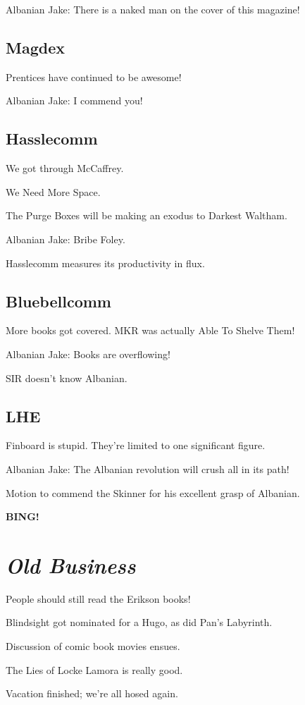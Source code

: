 \documentclass[10pt]{article}
\newcommand{\bing}{{\bf BING!} }
\newcommand{\goto}[1]{\bing \vskip 12pt \section*{{\em{#1}}}}
\begin{document}
Albanian Jake:  There is a naked man on the cover of this magazine!

\subsection*{Magdex}

Prentices have continued to be awesome!

Albanian Jake: I commend you!

\subsection*{Hasslecomm}

We got through McCaffrey.

We Need More Space.

The Purge Boxes will be making an exodus to Darkest Waltham.

Albanian Jake:  Bribe Foley.

Hasslecomm measures its productivity in flux.

\subsection*{Bluebellcomm}

More books got covered.  MKR was actually Able To Shelve Them!

Albanian Jake:  Books are overflowing!

SIR doesn't know Albanian.

\subsection*{LHE}

Finboard is stupid.  They're limited to one significant figure.

Albanian Jake: The Albanian revolution will crush all in its path!

Motion to commend the Skinner for his excellent grasp of Albanian. 

\goto{Old Business}

People should still read the Erikson books!

Blindsight got nominated for a Hugo, as did Pan's Labyrinth.

Discussion of comic book movies ensues.

The Lies of Locke Lamora is really good.

Vacation finished; we're all hosed again.
\end{document}
